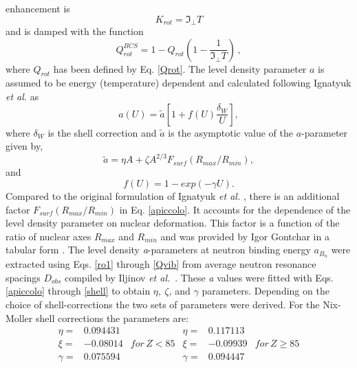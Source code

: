 \documentclass[twocolumn,amsmath,amssymb,10pt,groupedaddress,letter]{revtex4}
\begin{document}
enhancement is
\begin{equation}
K_{rot}=\Im_{\perp}T\label{KrotBCS}
\end{equation}
and is damped with the function
\begin{equation}
Q_{rot}^{BCS}=1-Q_{rot}\left(1-\frac{1}{\Im_{\perp}T}\right)\,,\label{QrotBCS}
\end{equation}
\noindent where $Q_{rot}$ has been defined by Eq. \ref{Qrot}.
The level density
parameter $a$ is assumed to be energy (temperature)
dependent and calculated following Ignatyuk \emph{et al.} \cite{ignaa}
as
\begin{equation}
a(U)=\widetilde{a}[1+f(U)\frac{\delta_{W}}{U}],\label{apiccolo}
\end{equation}
\noindent where $\delta_{W}$ is the shell correction and $\widetilde{a}$ is
the asymptotic value of the $a$-parameter given by,
\begin{equation}
\widetilde{a}=\eta A+\zeta A^{2/3}F_{surf}(R_{max}/R_{min}),\label{aassym}
\end{equation}
and
\begin{equation}
f(U)=1-exp(-\gamma U).\label{shell}
\end{equation}
Compared to the original formulation of Ignatyuk \emph{et al.} \cite{ignaa},
there is an additional factor $F_{surf}(R_{max}/R_{min})$ in Eq.
\ref{apiccolo}. It accounts for the dependence of the level density
parameter on nuclear deformation. This factor is a function of the
ratio of nuclear axes $R_{max}$ and $R_{min}$ and was provided by
Igor Gontchar \cite{gontchar} in a tabular form .
The level density \emph{a}-parameters at neutron binding energy $a_{B_{n}}$
were extracted using Eqs. \ref{ro1} through \ref{Qvib} from average
neutron resonance spacings $D_{obs}$ compiled by Iljinov {\it et al.}~\cite{Mebel}.
These \emph{a} values were fitted with Eqs. \ref{apiccolo} through
\ref{shell} to obtain \emph{$\eta$, $\zeta$,} and \emph{$\gamma$}
parameters. Depending on the choice of shell-corrections the two sets
of parameters were derived. For the Nix-Moller shell corrections \cite{masses}
the parameters are:
\begin{equation}
\begin{array}{ccccccc}
\eta= & 0.094431 &  & \eta= & 0.117113\\
\xi= & -0.08014 & for\, Z<85 & \xi= & -0.09939 & for\, Z\geq85\\
\gamma= & 0.075594 &  & \gamma= & 0.094447\end{array}\end{equation}
\end{document}
